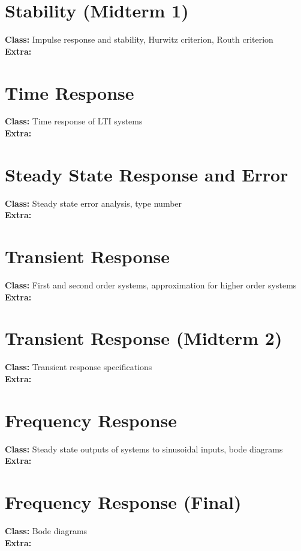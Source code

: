 \documentclass[margin]{scrartcl}
\begin{document}
\section{Stability (Midterm 1)}
\textbf{Class:} Impulse response and stability, Hurwitz criterion, Routh criterion \\
\textbf{Extra:} 

\section{Time Response}
\textbf{Class:} Time response of LTI systems \\
\textbf{Extra:} 

\section{Steady State Response and Error}
\textbf{Class:} Steady state error analysis, type number \\
\textbf{Extra:}

\section{Transient Response}
\textbf{Class:}  First and second order systems, approximation for higher order systems \\
\textbf{Extra:} 

\section{Transient Response (Midterm 2)} 
\textbf{Class:} Transient response specifications \\
\textbf{Extra:} 

\section{Frequency Response}
\textbf{Class:} Steady state outputs of systems to sinusoidal inputs, bode diagrams \\
\textbf{Extra:} 

\section{Frequency Response (Final)}
\textbf{Class:} Bode diagrams \\
\textbf{Extra:} 
\end{document}
